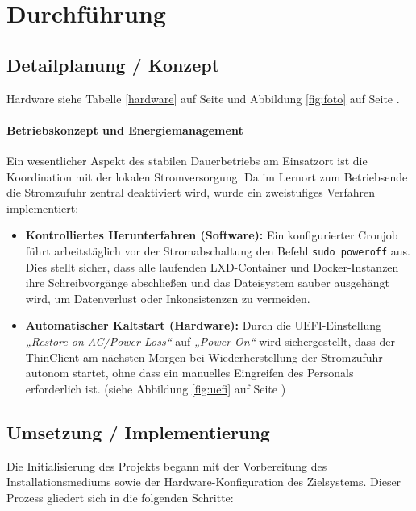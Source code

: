 \documentclass[11pt,
a4paper,
numbers=nonperiod,
footsepline,
oneside,
numbers=noenddot,
bibliography=totoc
]{scrartcl}
\begin{document}
\newpage
\section{Durchführung}
\bigskip
\subsection{Detailplanung / Konzept}

Hardware siehe Tabelle \ref{hardware} auf Seite \pageref{hardware} und Abbildung \ref{fig:foto} auf Seite \pageref{fig:foto}.

\paragraph{Betriebskonzept und Energiemanagement} \label{planung}
Ein wesentlicher Aspekt des stabilen Dauerbetriebs am Einsatzort ist die Koordination mit der lokalen Stromversorgung. Da im Lernort zum Betriebsende die Stromzufuhr zentral deaktiviert wird, wurde ein zweistufiges Verfahren implementiert:

\begin{itemize}
	\item \textbf{Kontrolliertes Herunterfahren (Software):} Ein konfigurierter Cronjob führt arbeitstäglich vor der Stromabschaltung den Befehl \texttt{sudo poweroff} aus. Dies stellt sicher, dass alle laufenden LXD-Container und Docker-Instanzen ihre Schreibvorgänge abschließen und das Dateisystem sauber ausgehängt wird, um Datenverlust oder Inkonsistenzen zu vermeiden.
	\item \textbf{Automatischer Kaltstart (Hardware):} Durch die UEFI-Einstellung \textit{„Restore on AC/Power Loss“} auf \textit{„Power On“} wird sichergestellt, dass der ThinClient am nächsten Morgen bei Wiederherstellung der Stromzufuhr autonom startet, ohne dass ein manuelles Eingreifen des Personals erforderlich ist. (siehe Abbildung \ref{fig:uefi} auf Seite \pageref{fig:uefi})
\end{itemize}

\subsection{Umsetzung / Implementierung}

Die Initialisierung des Projekts begann mit der Vorbereitung des Installationsmediums sowie der Hardware-Konfiguration des Zielsystems. Dieser Prozess gliedert sich in die folgenden Schritte:
\end{document}
